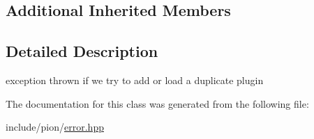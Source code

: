 \subsection*{Additional Inherited Members}


\subsection{Detailed Description}
exception thrown if we try to add or load a duplicate plugin 

The documentation for this class was generated from the following file\-:\begin{DoxyCompactItemize}
\item 
include/pion/\hyperlink{error_8hpp}{error.\-hpp}\end{DoxyCompactItemize}
